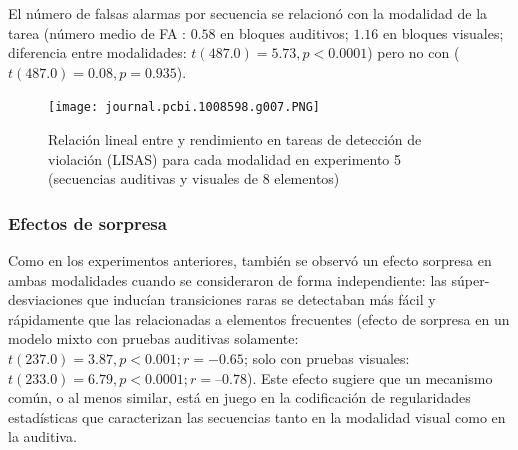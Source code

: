 El número de falsas alarmas por secuencia se relacionó con la modalidad de la tarea (número medio de FA : $0.58$ en bloques auditivos; $1.16$ en bloques visuales; diferencia entre modalidades: $t (487.0) = 5.73, p < 0.0001$) pero no con \mdlbin ($t(487.0) = 0.08, p = 0.935$).

\begin{figure}[t!]
   \texttt{[image: journal.pcbi.1008598.g007.PNG]}
   \centering
   \caption{Relación lineal entre \mdlbin y rendimiento en tareas de detección de violación (LISAS) para cada modalidad en experimento 5 (secuencias auditivas y visuales de 8 elementos)}
   \label{PlosBIO-F7}
\end{figure}

\subsubsection*{Efectos de sorpresa}


Como en los experimentos anteriores, también se observó un efecto sorpresa en ambas modalidades cuando se consideraron de forma independiente: las súper-desviaciones que inducían transiciones raras se detectaban más fácil y rápidamente que las relacionadas a elementos frecuentes (efecto de sorpresa en un modelo mixto con pruebas auditivas solamente: $t(237.0) = 3.87, p < 0.001; r =-0.65$; solo con pruebas visuales: $t (233.0) = 6.79, p < 0.0001; r = –0.78$). Este efecto sugiere que un mecanismo común, o al menos similar, está en juego en la codificación de regularidades estadísticas que caracterizan las secuencias tanto en la modalidad visual como en la auditiva.


